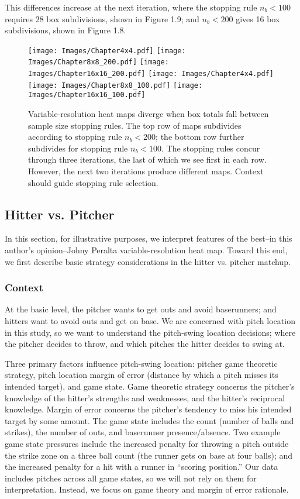 This differences increase at the next iteration, where the stopping rule $n_{b} < 100$ requires 28 box subdivisions, shown in Figure 1.9; and $n_{b} < 200$ gives 16 box subdivisions, shown in Figure 1.8.
        \begin{figure}[H]
      	\centering      
      	\texttt{[image: Images/Chapter4x4.pdf]}
      	\texttt{[image: Images/Chapter8x8\_200.pdf]}
      	\texttt{[image: Images/Chapter16x16\_200.pdf]}
      	\texttt{[image: Images/Chapter4x4.pdf]}
      	\texttt{[image: Images/Chapter8x8\_100.pdf]}
      	\texttt{[image: Images/Chapter16x16\_100.pdf]}
      	\caption{Variable-resolution heat maps diverge when box totals fall between sample size stopping rules. The top row of maps subdivides according to stopping rule $n_{b} < 200$; the bottom row further subdivides for stopping rule $n_{b} < 100$. The stopping rules concur through three iterations, the last of which we see first in each row. However, the next two iterations produce different maps. Context should guide stopping rule selection.}
\end{figure}

\subsection{Hitter vs. Pitcher} %
In this section, for illustrative purposes, we interpret features of the best--in this author's opinion--Johny Peralta variable-resolution heat map. Toward this end, we first describe basic strategy considerations in the hitter vs. pitcher matchup. 

\subsubsection{Context}
At the basic level, the pitcher wants to get outs and avoid baserunners; and hitters want to avoid outs and get on base. We are concerned with pitch location in this study, so we want to understand the pitch-swing location decisions; where the pitcher decides to throw, and which pitches the hitter decides to swing at. 

Three primary factors influence pitch-swing location: pitcher game theoretic strategy, pitch location margin of error (distance by which a pitch misses its intended target), and game state. Game theoretic strategy concerns the pitcher's knowledge of the hitter's strengths and weaknesses, and the hitter's reciprocal knowledge. Margin of error concerns the pitcher's tendency to miss his intended target by some amount. The game state includes the count (number of balls and strikes), the number of outs, and baserunner presence/absence. Two example game state pressures include the increased penalty for throwing a pitch outside the strike zone on a three ball count (the runner gets on base at four balls); and the increased penalty for a hit with a runner in ``scoring position.'' Our data includes pitches across all game states, so we will not rely on them for interpretation. Instead, we focus on game theory and margin of error rationale. 

